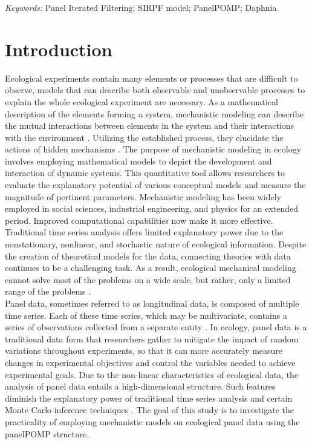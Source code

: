 \documentclass[12pt]{article}
\begin{document}
\noindent%
{\it Keywords:}  Panel Iterated Filtering; SIRPF model; PanelPOMP; Daphnia. 
\vfill

\newpage
{} %
\section{Introduction}
\label{sec:intro}

Ecological experiments contain many elements or processes that are difficult to observe, models that can describe both observable and unobservable processes to explain the whole ecological experiment are necessary. As a mathematical description of the elements forming a system, mechanistic modeling can describe the mutual interactions between elements in the system and their interactions with the environment \citep{Stalidzans2020}. Utilizing the established process, they elucidate the actions of hidden mechanisms \citep{Duarte2003}. The purpose of mechanistic modeling in ecology involves employing mathematical models to depict the development and interaction of dynamic systems. This quantitative tool allows researchers to evaluate the explanatory potential of various conceptual models and measure the magnitude of pertinent parameters. Mechanistic modeling has been widely employed in social sciences, industrial engineering, and physics for an extended period. Improved computational capabilities now make it more effective. Traditional time series analysis offers limited explanatory power due to the nonstationary, nonlinear, and stochastic nature of ecological information. Despite the creation of theoretical models for the data, connecting theories with data continues to be a challenging task. As a result, ecological mechanical modeling cannot solve most of the problems on a wide scale, but rather, only a limited range of the problems \citep{levin1992problem}.\\

Panel data, sometimes referred to as longitudinal data, is composed of multiple time series. Each of these time series, which may be multivariate, contains a series of observations collected from a separate entity  \citep{Carles2020}. In ecology, panel data is a traditional data form that researchers gather to mitigate the impact of random variations throughout experiments, so that it can more accurately measure changes in experimental objectives and control the variables needed to achieve experimental goals. Due to the non-linear characteristics of ecological data, the analysis of panel data entails a high-dimensional structure. Such features diminish the explanatory power of traditional time series analysis and certain Monte Carlo inference techniques \citep{johnstone2009statistical}. The goal of this study is to investigate the practicality of employing mechanistic models on ecological panel data using the panelPOMP structure.\\
\end{document}
